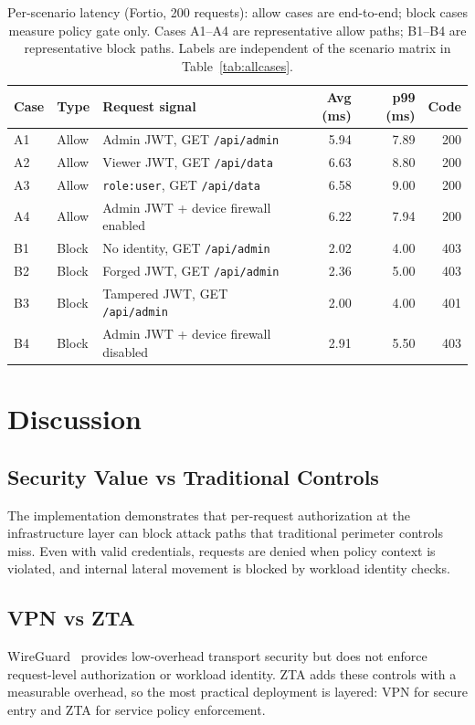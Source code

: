 \documentclass[conference]{IEEEtran}
\begin{document}
\begin{table}[!t]
\caption{Per-scenario latency (Fortio, 200 requests): allow cases are end-to-end;
block cases measure policy gate only. Cases A1--A4 are representative allow paths;
B1--B4 are representative block paths. Labels are independent of the scenario matrix
in Table~\ref{tab:allcases}.}
\label{tab:policy-cost}
\centering
\footnotesize
\begin{tabularx}{\columnwidth}{l l >{\raggedright\arraybackslash}X r r r}
\toprule
Case & Type & Request signal & Avg (ms) & p99 (ms) & Code \\
\midrule
A1 & Allow & Admin JWT, GET \texttt{/api/admin} & 5.94 & 7.89 & 200 \\
A2 & Allow & Viewer JWT, GET \texttt{/api/data} & 6.63 & 8.80 & 200 \\
A3 & Allow & \texttt{role:user}, GET \texttt{/api/data} & 6.58 & 9.00 & 200 \\
A4 & Allow & Admin JWT + device firewall enabled & 6.22 & 7.94 & 200 \\
B1 & Block & No identity, GET \texttt{/api/admin} & 2.02 & 4.00 & 403 \\
B2 & Block & Forged JWT, GET \texttt{/api/admin} & 2.36 & 5.00 & 403 \\
B3 & Block & Tampered JWT, GET \texttt{/api/admin} & 2.00 & 4.00 & 401 \\
B4 & Block & Admin JWT + device firewall disabled & 2.91 & 5.50 & 403 \\
\bottomrule
\end{tabularx}
\end{table}

\vspace{4pt}
\section{Discussion}
\subsection{Security Value vs Traditional Controls}
The implementation demonstrates that per-request authorization at the infrastructure
layer can block attack paths that traditional perimeter controls miss. Even with valid
credentials, requests are denied when policy context is violated, and internal lateral
movement is blocked by workload identity checks.

\subsection{VPN vs ZTA}
WireGuard~\cite{wireguard} provides low-overhead transport security but does not enforce
request-level authorization or workload identity. ZTA adds these controls with a measurable
overhead, so the most practical deployment is layered: VPN for secure entry and ZTA for
service policy enforcement.
\end{document}
